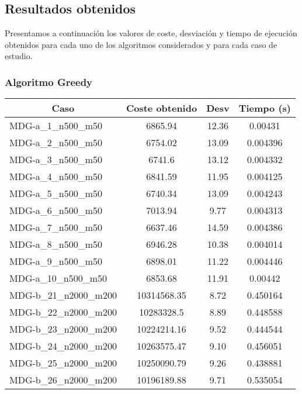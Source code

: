 \documentclass[10pt,a4paper]{article}
\begin{document}
	\subsection{Resultados obtenidos}
	
	Presentamos a continuación los valores de coste, desviación  y tiempo de ejecución obtenidos para cada uno de los algoritmos considerados y para cada caso de estudio.
	\newpage
	\subsubsection{Algoritmo Greedy}
\begin{table}[H]
	\begin{center}
		\begin{tabular}{|l|c|c|c|} 
			\hline
			\multicolumn{1}{|c|}{\textbf{Caso}} & \textbf{Coste obtenido} & \textbf{Desv} & \textbf{Tiempo (s)} \\ \hline
			MDG-a\_1\_n500\_m50 & 6865.94 & 12.36 & 0.00431 \\ \hline
			MDG-a\_2\_n500\_m50 & 6754.02 & 13.09 & 0.004396 \\ \hline
			MDG-a\_3\_n500\_m50 & 6741.6 & 13.12 & 0.004332 \\ \hline
			MDG-a\_4\_n500\_m50 & 6841.59 & 11.95 & 0.004125 \\ \hline
			MDG-a\_5\_n500\_m50 & 6740.34 & 13.09 & 0.004243 \\ \hline
			MDG-a\_6\_n500\_m50 & 7013.94 & 9.77 & 0.004313 \\ \hline
			MDG-a\_7\_n500\_m50 & 6637.46 & 14.59 & 0.004386 \\ \hline
			MDG-a\_8\_n500\_m50 & 6946.28 & 10.38 & 0.004014 \\ \hline
			MDG-a\_9\_n500\_m50 & 6898.01 & 11.22 & 0.004446 \\ \hline
			MDG-a\_10\_n500\_m50 & 6853.68 & 11.91 & 0.00442 \\ \hline
			MDG-b\_21\_n2000\_m200 & 10314568.35 & 8.72 & 0.450164 \\ \hline
			MDG-b\_22\_n2000\_m200 & 10283328.5 & 8.89 & 0.448588 \\ \hline
			MDG-b\_23\_n2000\_m200 & 10224214.16 & 9.52 & 0.444544 \\ \hline
			MDG-b\_24\_n2000\_m200 & 10263575.47 & 9.10 & 0.456051 \\ \hline
			MDG-b\_25\_n2000\_m200 & 10250090.79 & 9.26 & 0.438881 \\ \hline
			MDG-b\_26\_n2000\_m200 & 10196189.88 & 9.71 & 0.535054 \\ \hline

\end{tabular}
\end{center}
\end{table}
\end{document}
